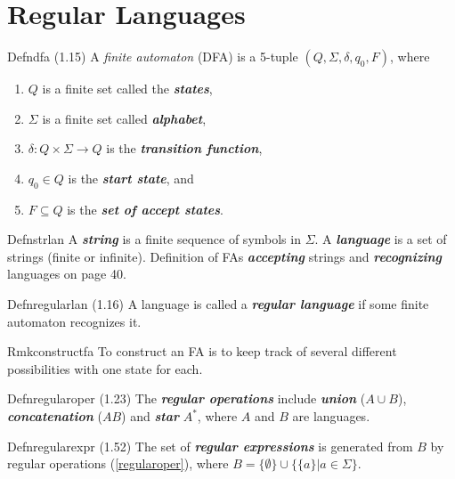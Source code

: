 \chapter{Regular Languages}

\begin{reference}{Defn}{dfa}
  (1.15) A \emph{finite automaton} (DFA) is a 5-tuple $(Q,\Sigma,\delta,q_0,F)$, where
  \begin{enumerate}
    \item $Q$ is a finite set called the \textbf{\textit{states}},
    \item $\Sigma$ is a finite set called \textbf{\textit{alphabet}},
    \item $\delta:Q\times\Sigma\rightarrow Q$ is the \textbf{\textit{transition function}},
    \item $q_0\in Q$ is the \textbf{\textit{start state}}, and
    \item $F\subseteq Q$ is the \textbf{\textit{set of accept states}}.\qedhere
  \end{enumerate}
\end{reference}

\begin{reference}{Defn}{strlan}
  A \textbf{\textit{string}} is a finite sequence of symbols in $\Sigma$. A \textbf{\textit{language}} is a set of strings (finite or infinite). Definition of FAs \textbf{\textit{accepting}} strings and \textbf{\textit{recognizing}} languages on page 40.
\end{reference}

\begin{reference}{Defn}{regularlan}
  (1.16) A language is called a \textbf{\textit{regular language}} if some finite automaton
  recognizes it.
\end{reference}

\begin{reference}{Rmk}{constructfa}
  To construct an FA is to keep track of several different possibilities with one state for each.
\end{reference}

\begin{reference}{Defn}{regularoper}
  (1.23) The \textbf{\textit{regular operations}} include \textbf{\textit{union}} ($A\cup B$), \textbf{\textit{concatenation}} ($AB$) and \textbf{\textit{star}} $A^*$, where $A$ and $B$ are languages.
\end{reference}

\begin{reference}{Defn}{regularexpr}
  (1.52) The set of \textbf{\textit{regular expressions}} is generated from $B$ by regular operations (\ref{regularoper}), where $B=\{\emptyset\}\cup\{\{a\}|a\in \Sigma\}$.
\end{reference}

